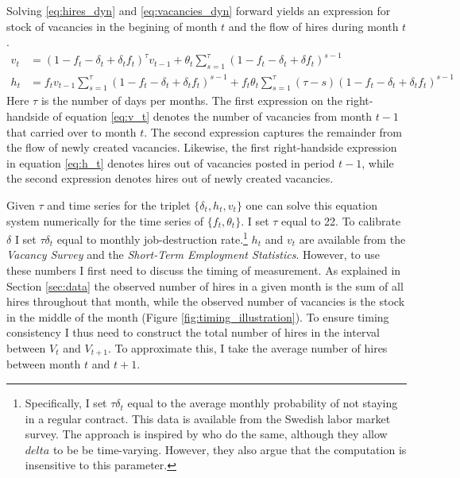 Solving \eqref{eq:hires_dyn} and \eqref{eq:vacancies_dyn} forward yields an expression for stock of vacancies in the begining of month $t$ and the flow of hires during month $t$.
{\scriptsize\begin{align}
v_t&=\left( 1-f_t-\delta_t+\delta_t f_t \right)^\tau v_{t-1} + \theta_t \sum_{s=1}^{\tau} \left( 1-f_t-\delta_t+\delta f_t \right)^{s-1}  \label{eq:v_t} \\
h_t&=f_t v_{t-1} \sum_{s=1}^{\tau} \left( 1-f_t-\delta_t+\delta_t f_t \right)^{s-1} + f_t \theta_t \sum_{s=1}^{\tau} \left( \tau- s\right) \left( 1-f_t-\delta_t+\delta_t f_t \right)^{s-1} \label{eq:h_t}
\end{align}}
Here $\tau$ is the number of days per months. The first expression on the right-handside of equation \eqref{eq:v_t} denotes the number of vacancies from month $t-1$ that carried over to month $t$. The second expression captures the remainder from the flow of newly created vacancies. Likewise, the first right-handside expression in equation \eqref{eq:h_t} denotes hires out of vacancies posted in period $t-1$, while the second expression denotes hires out of newly created vacancies. 

Given $\tau$ and time series for the triplet $\{\delta_t, h_t, v_t \}$ one can solve this equation system numerically for the time series of $\{ f_t, \theta_t \}$. I set $\tau$ equal to 22. To calibrate $\delta$ I set $\tau \delta_t$ equal to monthly job-destruction rate.\footnote{Specifically, I set $\tau \delta_t$ equal to the average monthly probability of not staying in a regular contract. This data is available from the Swedish labor market survey. The approach is inspired by \cite{Davis2013} who do the same, although they allow $delta$ to be be time-varying. However, they also argue that the computation is insensitive to this parameter.} $h_t$ and $v_t$ are available from the \emph{Vacancy Survey} and the \emph{Short-Term Employment Statistics}. However, to use these numbers I first need to discuss the timing of measurement. As explained in Section \ref{sec:data} the observed number of hires in a given month is the sum of all hires throughout that month, while the observed number of vacancies is the stock in the middle of the month (Figure \ref{fig:timing_illustration}). To ensure timing consistency I thus need to construct the total number of hires in the interval between $V_t$ and $V_{t+1}$. To approximate this, I take the average number of hires between month $t$ and $t+1$. 

